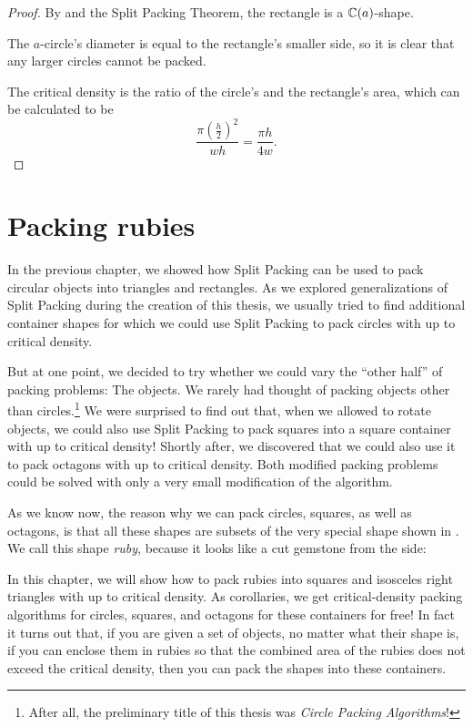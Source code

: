 \documentclass[a4paper,style=print,bibliography=totoc,nexus,lnum,extramargin]{tubsbook}
\begin{document}
\begin{proof}
    By  and the Split Packing Theorem, the rectangle is a $\mathbb{C}(a)$-shape.

    The $a$-circle's diameter is equal to the rectangle's smaller side, so it is clear that any larger circles cannot be packed.

    The critical density is the ratio of the circle's and the rectangle's area, which can be calculated to be $$\frac{\pi (\frac{h}{2})^2}{wh} = \frac{\pi h}{4w}.$$
\end{proof}

\chapter{Packing rubies}\label{ch:rubies}

In the previous chapter, we showed how Split Packing can be used to pack circular objects into triangles and rectangles.
As we explored generalizations of Split Packing during the creation of this thesis, we usually tried to find additional container shapes for which we could use Split Packing to pack circles with up to critical density. 

But at one point, we decided to try whether we could vary the “other half” of packing problems: The objects. We rarely had thought of packing objects other than circles.\footnote{After all, the preliminary title of this thesis was \emph{Circle Packing Algorithms}!} 
We were surprised to find out that, when we allowed to rotate objects, we could also use Split Packing to pack squares into a square container with up to critical density! Shortly after, we discovered that we could also use it to pack octagons with up to critical density. Both modified packing problems could be solved with only a very small modification of the algorithm.

As we know now, the reason why we can pack circles, squares, as well as octagons, is that all these shapes are subsets of the very special shape shown in . We call this shape \emph{ruby}, because it looks like a cut gemstone from the side:


In this chapter, we will show how to pack rubies into squares and isosceles right triangles with up to critical density. As corollaries, we get critical-density packing algorithms for circles, squares, and octagons for these containers for free!
In fact it turns out that, if you are given a set of objects, no matter what their shape is, if you can enclose them in rubies so that the combined area of the rubies does not exceed the critical density, then you can pack the shapes into these containers.
\end{document}
